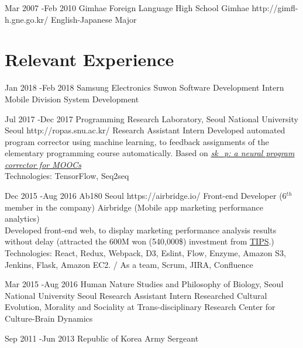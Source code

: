 \documentclass[10pt]{article} %
\begin{document}

\jobnocontent
{Mar 2007 -}{Feb 2010}
{Gimhae Foreign Language High School}
{Gimhae}
{http://gimfl-h.gne.go.kr/}
{English-Japanese Major}
{}
\fi

\section{Relevant Experience}

\job
{Jan 2018 -}{Feb 2018}
{Samsung Electronics}
{Suwon}
{}
{Software Development Intern}
{Mobile Division System Development}

\job
{Jul 2017 -}{Dec 2017}
{Programming Research Laboratory, Seoul National University}
{Seoul}
{http://ropas.snu.ac.kr/}
{Research Assistant Intern}
{Developed automated program corrector using machine learning, to feedback assignments of the elementary programming course automatically. Based on \textit{\href{https://dl.acm.org/citation.cfm?id=2989222}{
sk\_p: a neural program corrector for MOOCs}}\\
Technologies: TensorFlow, Seq2seq}

\job
{Dec 2015 -}{Aug 2016}
{Ab180}
{Seoul}
{https://airbridge.io/}
{Front-end Developer (6$^{th}$ member in the company)}
{Airbridge (Mobile app marketing performance analytics)\\
Developed front-end web, to display marketing performance analysis results without delay (attracted the 600M won (540,000\$) investment from \href{http://www.jointips.or.kr/}{TIPS}.)\\
Technologies: React, Redux, Webpack, D3, Eslint, Flow, Enzyme, Amazon S3, Jenkins, Flask, Amazon EC2. / As a team, Scrum, JIRA, Confluence}

\if{}
\job
{Mar 2015 -}{Aug 2016}
{Human Nature Studies and Philosophy of Biology, Seoul National University}
{Seoul}
{}
{Research Assistant Intern}
{Researched Cultural Evolution, Morality and Sociality at Trans-disciplinary Research Center for Culture-Brain Dynamics}

\jobnocontent
{Sep 2011 -}{Jun 2013}
{Republic of Korea Army}
{}
{}
{Sergeant}
\fi
\end{document}
